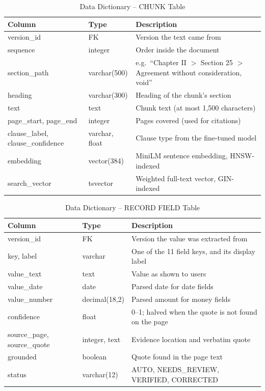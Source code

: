 \begin{table}[H]\centering\small
\caption{Data Dictionary -- CHUNK Table}\label{tab:dd-chunk}
\begin{tabularx}{\textwidth}{|p{3.2cm}|p{2.6cm}|X|}\hline
\textbf{Column} & \textbf{Type} & \textbf{Description} \\ \hline
version\_id & FK & Version the text came from \\ \hline
sequence & integer & Order inside the document \\ \hline
section\_path & varchar(500) & e.g.\ ``Chapter II $>$ Section 25 $>$ Agreement without consideration, void'' \\ \hline
heading & varchar(300) & Heading of the chunk's section \\ \hline
text & text & Chunk text (at most 1,500 characters) \\ \hline
page\_start, page\_end & integer & Pages covered (used for citations) \\ \hline
clause\_label, clause\_confidence & varchar, float & Clause type from the fine-tuned model \\ \hline
embedding & vector(384) & MiniLM sentence embedding, HNSW-indexed \\ \hline
search\_vector & tsvector & Weighted full-text vector, GIN-indexed \\ \hline
\end{tabularx}
\end{table}

\begin{table}[H]\centering\small
\caption{Data Dictionary -- RECORD FIELD Table}\label{tab:dd-field}
\begin{tabularx}{\textwidth}{|p{3.2cm}|p{2.6cm}|X|}\hline
\textbf{Column} & \textbf{Type} & \textbf{Description} \\ \hline
version\_id & FK & Version the value was extracted from \\ \hline
key, label & varchar & One of the 11 field keys, and its display label \\ \hline
value\_text & text & Value as shown to users \\ \hline
value\_date & date & Parsed date for date fields \\ \hline
value\_number & decimal(18,2) & Parsed amount for money fields \\ \hline
confidence & float & 0--1; halved when the quote is not found on the page \\ \hline
source\_page, source\_quote & integer, text & Evidence location and verbatim quote \\ \hline
grounded & boolean & Quote found in the page text \\ \hline
status & varchar(12) & AUTO, NEEDS\_REVIEW, VERIFIED, CORRECTED \\ \hline
\end{tabularx}
\end{table}

